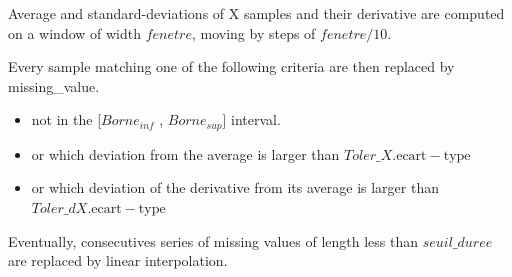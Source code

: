   Average and standard-deviations of X samples and 
their derivative are computed on a window
of width $fenetre$, moving by steps of $fenetre/10$.

  Every sample matching one of the following criteria are then
replaced by missing\_value.
\begin{itemize}
    \item not in the [$Borne_{inf}$ , $Borne_{sup}$] interval.
    \item or which deviation from the average 
is larger than $Toler\_X . \mathrm{ecart-type}$ 
    \item or which  deviation of the derivative from its average 
is  larger than $Toler\_{dX} . \mathrm{ecart-type}$ 
\end{itemize}
  
  Eventually, consecutives series of missing values
of length less than $seuil\_duree$ are replaced 
by linear interpolation.
